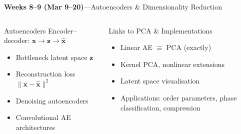 \documentclass[aspectratio=169,11pt]{beamer}
\begin{document}
\begin{frame}{{\color{mlgold}\textbf{Weeks 8--9 (Mar 9--20)}\;---\;Autoencoders \& Dimensionality Reduction}}
  \begin{columns}[T]
      \begin{block}{Autoencoders}
        Encoder--decoder: $\bm{x}\to\bm{z}\to\hat{\bm{x}}$
        \begin{itemize}\itemsep1pt
          \item Bottleneck latent space $\bm{z}$
          \item Reconstruction loss $\|\bm{x}-\hat{\bm{x}}\|^2$
          \item Denoising autoencoders
          \item Convolutional AE architectures
        \end{itemize}
      \end{block}
      \begin{block}{Links to PCA \& Implementations}
        \begin{itemize}\itemsep1pt
          \item Linear AE $\equiv$ PCA (exactly)
          \item Kernel PCA, nonlinear extensions
          \item Latent space visualisation
          \item Applications: order parameters,
                phase classification, compression
        \end{itemize}
      \end{block}
  \end{columns}
\end{frame}
\end{document}
